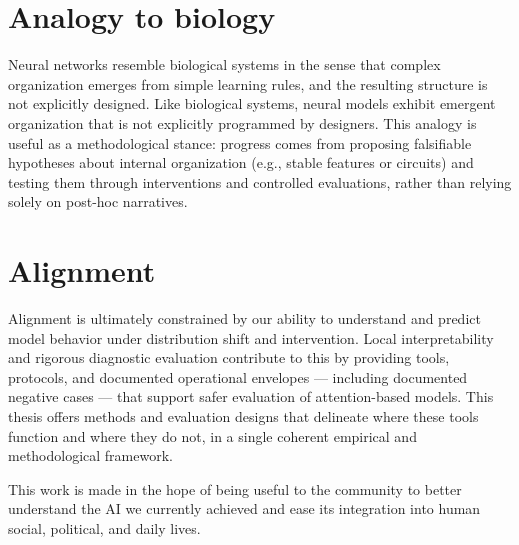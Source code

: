 ﻿\documentclass[../ppgc-tese.tex]{subfiles}
\begin{document}
\section{Analogy to biology}
Neural networks resemble biological systems in the sense that complex organization emerges from simple learning rules, and the resulting structure is not explicitly designed.
Like biological systems, neural models exhibit emergent organization that is not explicitly programmed by designers.
This analogy is useful as a methodological stance: progress comes from proposing falsifiable hypotheses about internal organization (e.g., stable features or circuits) and testing them through interventions and controlled evaluations, rather than relying solely on post-hoc narratives.

\section{Alignment}
Alignment is ultimately constrained by our ability to understand and predict model behavior under distribution shift and intervention. Local interpretability and rigorous diagnostic evaluation contribute to this by providing tools, protocols, and documented operational envelopes --- including documented negative cases --- that support safer evaluation of attention-based models. This thesis offers methods and evaluation designs that delineate where these tools function and where they do not, in a single coherent empirical and methodological framework.

This work is made in the hope of being useful to the community to better understand the AI we currently achieved and ease its integration into human social, political, and daily lives.
\end{document}
